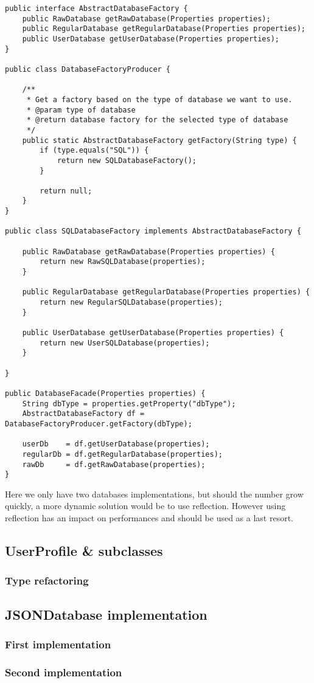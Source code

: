 \begin{lstlisting}
public interface AbstractDatabaseFactory {
	public RawDatabase getRawDatabase(Properties properties);
	public RegularDatabase getRegularDatabase(Properties properties);
	public UserDatabase getUserDatabase(Properties properties);
}

public class DatabaseFactoryProducer {
	
	/**
	 * Get a factory based on the type of database we want to use.
	 * @param type of database
	 * @return database factory for the selected type of database
	 */
	public static AbstractDatabaseFactory getFactory(String type) {
		if (type.equals("SQL")) {
			return new SQLDatabaseFactory();
		}
		
		return null;
	}
}

public class SQLDatabaseFactory implements AbstractDatabaseFactory {

	public RawDatabase getRawDatabase(Properties properties) {
		return new RawSQLDatabase(properties);
	}

	public RegularDatabase getRegularDatabase(Properties properties) {
		return new RegularSQLDatabase(properties);
	}

	public UserDatabase getUserDatabase(Properties properties) {
		return new UserSQLDatabase(properties);
	}

}

public DatabaseFacade(Properties properties) {
	String dbType = properties.getProperty("dbType");
	AbstractDatabaseFactory df = DatabaseFactoryProducer.getFactory(dbType);
	
	userDb    = df.getUserDatabase(properties);
	regularDb = df.getRegularDatabase(properties);
	rawDb     = df.getRawDatabase(properties);
}
\end{lstlisting}

Here we only have two databases implementations, but should the number grow
quickly, a more dynamic solution would be to use reflection. However using
reflection has an impact on performances and should be used as a last resort.


\subsection{UserProfile \& subclasses}

\subsubsection{Type refactoring}

\subsection{JSONDatabase implementation}

\subsubsection{First implementation}

\subsubsection{Second implementation}

\newpage
